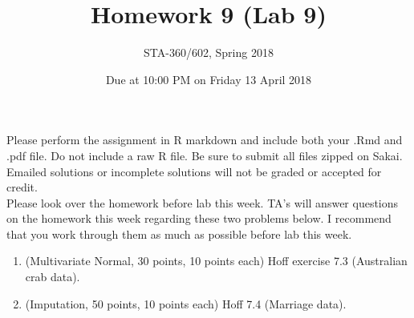 \documentclass{article}
\begin{document}
\title{Homework 9 (Lab 9)}
\author{STA-360/602, Spring 2018}
\date{Due at 10:00 PM on Friday 13 April 2018}
\maketitle

Please perform the assignment in R markdown and include both your
.Rmd and .pdf file. Do not include a raw R file.  Be sure to submit all files zipped
on Sakai. Emailed solutions or incomplete solutions will not be graded or accepted for credit. \\

Please look over the homework before lab this week. TA's will answer questions on the homework this week regarding these two 
problems below. I recommend that you work through them as much as possible before lab this week. 

\begin{enumerate}
\item (Multivariate Normal, 30 points, 10 points each) Hoff exercise 7.3 (Australian crab data).
\item (Imputation, 50 points, 10 points each) Hoff 7.4 (Marriage data).
\end{enumerate}
\end{document}
